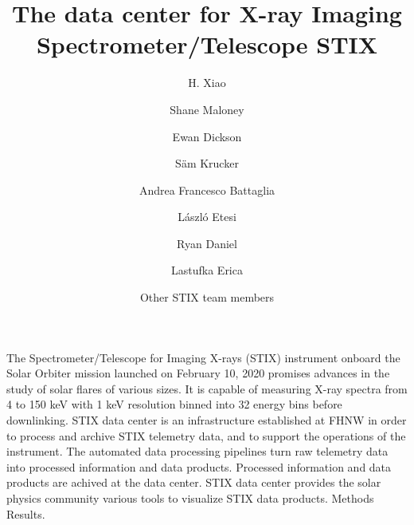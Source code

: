 \documentclass{aa}
\begin{document}
 


   \title{The data center for X-ray Imaging Spectrometer/Telescope STIX}

   \subtitle{}

   \author{H. Xiao
          \and 
          Shane Maloney 
          \and 
          Ewan Dickson 
          \and 
          S\"am Krucker
          \and Andrea Francesco Battaglia
            \and László Etesi 
          \and Ryan Daniel 
          \and Lastufka Erica 
          \and Other STIX team members
         }


   \date{}

 
  \abstract
   {} %
   { The Spectrometer/Telescope for Imaging X-rays (STIX) instrument onboard the Solar Orbiter mission launched on February 10, 2020 promises advances in the study of solar flares of various sizes. It is capable of measuring X-ray spectra from 4 to 150 keV with 1 keV resolution binned into 32 energy bins before downlinking. STIX data center is an infrastructure established at FHNW in order to process and archive STIX telemetry data, and to support the operations of the instrument. The automated data processing pipelines turn raw telemetry data into processed information and data products. Processed information and data products are achived at the data center.  STIX data center provides the solar physics community various tools to visualize STIX data products.
   }
   {Methods}
   {Results.}
   {}

\end{document}
